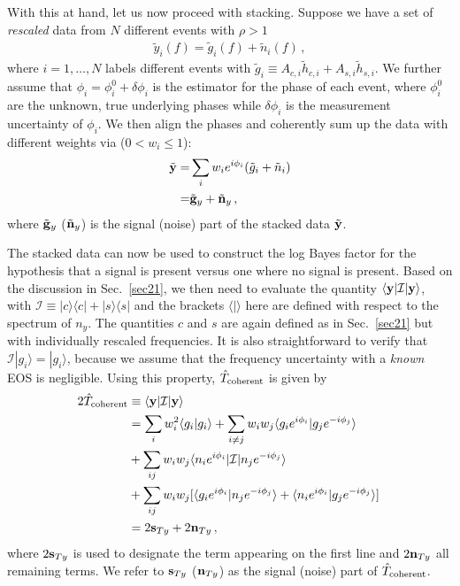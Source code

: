 \documentclass[prd,aps,floatfix,superscriptaddress,nofootinbib,twocolumn,10pt,English]{revtex4-1}
\begin{document}
With this at hand, let us now proceed with stacking. Suppose we have a
set of \emph{rescaled} data from $N$ different events with $\rho > 1$
\begin{align}
\tilde y_i(f) = \tilde g_i(f)+\tilde n_i(f)\,,
\end{align}
where $i=1,\ldots, N$ labels different events with $\tilde g_i \equiv
A_{c,i} \tilde h_{c,i}+A_{s,i} \tilde h_{s,i}$.  We further assume
that $\phi_i =\phi^0_i+\delta \phi_i$ is the estimator for the phase
of each event, where $\phi^0_i$ are the unknown, true underlying
phases while $\delta \phi_i$ is the measurement uncertainty of
$\phi_i$.  We then align the phases and coherently sum up the data
with different weights via ($0<w_i \leq 1$):
\begin{align}\label{eqsyny}
\tilde {\bf y} = &\sum_i w_i e^{i \phi_i} (\tilde g_i+\tilde n_i) \nonumber \\
= & \tilde {\bf g}_y+\tilde {\bf n}_y\,,
\end{align}
where $\tilde {\bf g}_y$ ($\tilde {\bf n}_y$) is the signal (noise) part of the stacked data $\tilde {\bf y}$.

The stacked data can now be used to construct the log Bayes factor for
the hypothesis that a signal is present versus one where no signal is
present.  Based on the discussion in Sec.~\ref{sec21}, we then need to
evaluate the quantity $\langle {\bf y} | \mathcal{I} | {\bf y}
\rangle$, with $\mathcal{I} \equiv | c\rangle \langle c |+|s \rangle
\langle s |$ and the brackets $\langle | \rangle$ here are defined
with respect to the spectrum of $n_y$. The quantities $c$ and $s$ are
again defined as in Sec.~\ref{sec21} but with individually rescaled
frequencies.  It is also straightforward to verify that $\mathcal{I}
|g_i \rangle =| g_i \rangle$, because we assume that the frequency
uncertainty with a {\it known} EOS is negligible. Using this property,
$\hat{T}_{\rm coherent}$ is given by
\begin{align}
2 \hat{T}_{\rm coherent} &\equiv \langle {\bf y} |\mathcal{I} | {\bf y} \rangle  \nonumber \\
&=  \sum_i w^2_i \langle g_i    | g_i \rangle+\sum_{i \neq j} w_i w_j \langle g_i  e^{i \phi_i} | g_j e^{-i \phi_j}  \rangle\,\nonumber \\
& +\sum_{ij} w_i w_j \langle n_i e^{i \phi_i}   | \mathcal{I} |n_j e^{-i \phi_j}  \rangle  \nonumber\\
&+ \sum_{ij} w_i w_j [\langle g_i e^{i \phi_i}  | n_j  e^{-i \phi_j} \rangle +\langle n_i  e^{i \phi_i}  | g_j  e^{-i \phi_j} \rangle ]\,\nonumber \\
& = 2 {\bf s}_{Ty}+2 {\bf n}_{Ty}\,,
\end{align}
where $2{\bf s}_{Ty}$ is used to designate the term appearing on the
first line and $2{\bf n}_{Ty}$ all remaining terms. We refer to ${\bf
  s}_{Ty}$ (${\bf n}_{Ty}$) as the signal (noise) part of
$\hat{T}_{\rm coherent}$.
\end{document}
